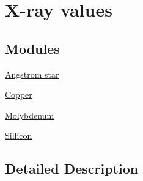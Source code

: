 \hypertarget{group___x-ray}{}\section{X-\/ray values}
\label{group___x-ray}
\subsection*{Modules}
\begin{DoxyCompactItemize}
\item 
\hyperlink{group___angstrom_star}{Angstrom star}
\item 
\hyperlink{group___copper}{Copper}
\item 
\hyperlink{group___molybdenum}{Molybdenum}
\item 
\hyperlink{group___sillicon}{Sillicon}
\end{DoxyCompactItemize}


\subsection{Detailed Description}
